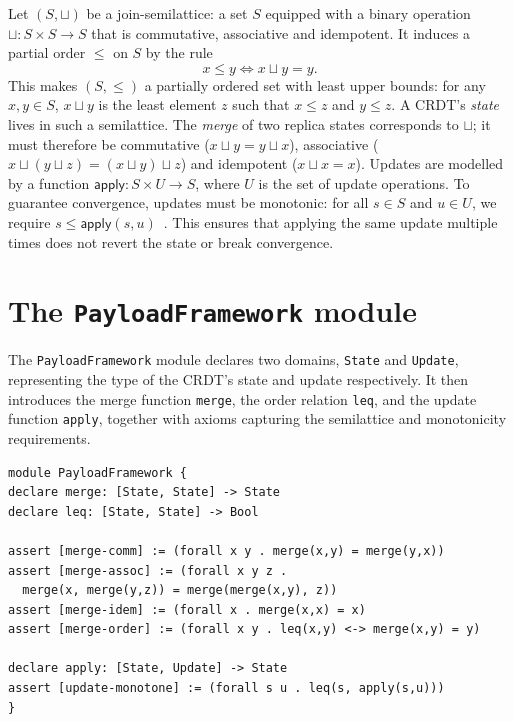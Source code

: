 Let $(S, \sqcup)$ be a join-semilattice: a set $S$ equipped with a binary operation $\sqcup : S \times S \to S$ that is commutative, associative and idempotent. It induces a partial order $\leq$ on $S$ by the rule
\[
  x \leq y \iff x \sqcup y = y.
\]
This makes $(S,\leq)$ a partially ordered set with least upper bounds: for any $x,y\in S$, $x \sqcup y$ is the least element $z$ such that $x \leq z$ and $y \leq z$. A CRDT’s \emph{state} lives in such a semilattice. The \emph{merge} of two replica states corresponds to $\sqcup$; it must therefore be commutative ($x \sqcup y = y \sqcup x$), associative ($x \sqcup (y \sqcup z) = (x \sqcup y) \sqcup z$) and idempotent ($x \sqcup x = x$). Updates are modelled by a function $\mathsf{apply} : S \times U \to S$, where $U$ is the set of update operations. To guarantee convergence, updates must be monotonic: for all $s\in S$ and $u\in U$, we require $s \leq \mathsf{apply}(s,u)$~\cite{shapiro2011conflict}. This ensures that applying the same update multiple times does not revert the state or break convergence.

\section{The \texttt{PayloadFramework} module}\label{sec:payload-code}

The \texttt{PayloadFramework} module declares two domains, \texttt{State} and \texttt{Update}, representing the type of the CRDT’s state and update respectively. It then introduces the merge function \texttt{merge}, the order relation \texttt{leq}, and the update function \texttt{apply}, together with axioms capturing the semilattice and monotonicity requirements.

\begin{lstlisting}[language=Athena,style=athena]
module PayloadFramework {
declare merge: [State, State] -> State
declare leq: [State, State] -> Bool

assert [merge-comm] := (forall x y . merge(x,y) = merge(y,x))
assert [merge-assoc] := (forall x y z .
  merge(x, merge(y,z)) = merge(merge(x,y), z))
assert [merge-idem] := (forall x . merge(x,x) = x)
assert [merge-order] := (forall x y . leq(x,y) <-> merge(x,y) = y)

declare apply: [State, Update] -> State
assert [update-monotone] := (forall s u . leq(s, apply(s,u)))
}
\end{lstlisting}

